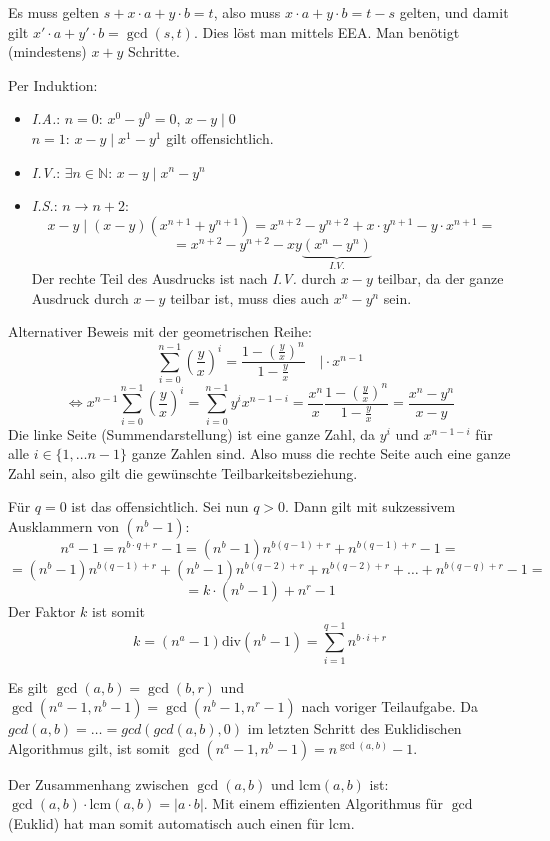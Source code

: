 \begin{flushenum}
\begin{flushalpha}
	\item Es muss gelten $s + x\cdot a + y \cdot b = t$, also muss $x\cdot a + y\cdot b = t-s$ gelten,
	und damit gilt $x'\cdot a + y' \cdot b = \gcd(s,t)$. Dies
	löst man mittels EEA. Man benötigt (mindestens) $x+y$ Schritte.
\end{flushalpha}

\item 
\begin{flushalpha}
\item Per Induktion:
\begin{itemize}
	\item \textit{I.A.}: $n=0$: $x^0 - y^0 = 0$, $x-y \mid 0$ \\ $n=1$: $x-y \mid x^1 - y^1$ gilt offensichtlich.
	\item \textit{I.V.}: $\exists n \in \mathbb{N}$: $x-y \mid x^n - y^n$
	\item \textit{I.S.}: $n \rightarrow n+2$:
	\[ x-y \mid (x-y)(x^{n+1} + y^{n+1}) = x^{n+2} - y^{n+2} + x\cdot y^{n+1} - y \cdot x^{n+1} =\]
	\[ = x^{n+2} - y^{n+2} - xy \underbrace{(x^{n} - y^{n})}_{I.V.}\]
	Der rechte Teil des Ausdrucks ist nach \textit{I.V.} durch $x-y$ teilbar, da der ganze Ausdruck durch $x-y$ teilbar ist, muss dies auch $x^n - y^n$ sein.
\end{itemize}
Alternativer Beweis mit der geometrischen Reihe:
\[ \sum_{i=0}^{n-1}\left(\frac{y}{x}\right)^i = \frac{1-\left(\frac{y}{x}\right)^n}{1-\frac{y}{x}} \quad \vert \cdot x^{n-1}\]
\[ \Leftrightarrow x^{n-1}  \sum_{i=0}^{n-1}\left(\frac{y}{x}\right)^i = \sum_{i=0}^{n-1} y^ix^{n-1-i} = \frac{x^n}{x}  \frac{1-\left(\frac{y}{x}\right)^n}{1-\frac{y}{x}}  = \frac{x^n - y^n}{x-y} \]
Die linke Seite (Summendarstellung) ist eine ganze Zahl, da $y^i$ und $x^{n-1-i}$ für alle $i \in \{1, \ldots n-1\}$ ganze Zahlen sind. Also muss
die rechte Seite auch eine ganze Zahl sein, also gilt die gewünschte Teilbarkeitsbeziehung.

\item Für $q=0$ ist das offensichtlich. Sei nun $q>0$. Dann gilt mit sukzessivem Ausklammern von $(n^b - 1)$:
\[
  n^a - 1 = n^{b\cdot q + r} - 1 = (n^b - 1)n^{b(q-1) + r} + n^{b(q-1) + r}-1 =
\]
\[
  = (n^b - 1)n^{b(q-1) + r} + (n^b - 1)n^{b(q-2) + r} + n^{b(q-2) + r} + \ldots
  +n^{b(q-q) + r} - 1 =\]\[= k \cdot (n^b-1) + n^r - 1
\]
Der Faktor $k$ ist somit \[ k = (n^a-1) \text{div} (n^b -1) = \sum_{i=1}^{q-1} n^{b\cdot i + r} \]
\item Es gilt $\gcd(a,b) = \gcd(b,r)$ und $\gcd(n^a-1,n^b-1) = \gcd(n^b-1,n^r-1)$ nach voriger Teilaufgabe.
Da $gcd(a,b) = \ldots = gcd( gcd(a,b), 0)$ im letzten Schritt des Euklidischen Algorithmus gilt, ist somit $\gcd(n^a -1,n^b-1) = n^{\gcd(a,b)}-1$.
\end{flushalpha}
\item Der Zusammenhang zwischen $\gcd(a,b)$ und $\text{lcm}(a,b)$ ist: $\gcd(a,b) \cdot \text{lcm}(a,b) = |a \cdot b|$. Mit einem effizienten Algorithmus für $\gcd$ (Euklid)
hat man somit automatisch auch einen für $\text{lcm}$.


\end{flushenum}
